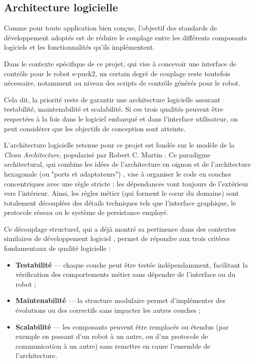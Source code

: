 \subsection{Architecture logicielle} \label{sec:architecture_logicielle}
Comme pour toute application bien conçue, l’objectif des standards de développement adoptés est de réduire le couplage entre les différents composants logiciels et les fonctionnalités qu’ils implémentent.

Dans le contexte spécifique de ce projet, qui vise à concevoir une interface de contrôle pour le robot e-puck2, un certain degré de couplage reste toutefois nécessaire, notamment au niveau des scripts de contrôle générés pour le robot.

Cela dit, la priorité reste de garantir une architecture logicielle assurant testabilité, maintenabilité et scalabilité. 
Si ces trois qualités peuvent être respectées à la fois dans le logiciel embarqué et dans l'interface utilisateur, on peut considérer que les objectifs de conception sont atteints.

L’architecture logicielle retenue pour ce projet est fondée sur le modèle de la \textit{Clean Architecture}, popularisé par Robert C. Martin \autocite{martin_clean_2012}.
Ce paradigme architectural, qui combine les idées de l’architecture en oignon \autocite{palermo_onion_2008} et de l’architecture hexagonale (ou "ports et adaptateurs") \autocite{cockburn_hexagonal_2005}, vise à organiser le code en couches concentriques avec une règle stricte : les dépendances vont toujours de l’extérieur vers l’intérieur.
Ainsi, les règles métier (qui forment le cœur du domaine) sont totalement découplées des détails techniques tels que l’interface graphique, le protocole réseau ou le système de persistance employé.

Ce découplage structurel, qui a déjà montré sa pertinence dans des contextes similaires de développement logiciel \autocite{tinael_devresse_analyse_2023}, permet de répondre aux trois critères fondamentaux de qualité logicielle :
\begin{itemize}
    \item \textbf{Testabilité} — chaque couche peut être testée indépendamment, facilitant la vérification des comportements métier sans dépendre de l’interface ou du robot ;
    
    \item \textbf{Maintenabilité} — la structure modulaire permet d’implémenter des évolutions ou des correctifs sans impacter les autres couches ;
    
    \item \textbf{Scalabilité} — les composants peuvent être remplacés ou étendus (par exemple en passant d’un robot à un autre, ou d’un protocole de communication à un autre) sans remettre en cause l’ensemble de l’architecture.
\end{itemize}
